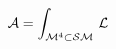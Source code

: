 \begin{equation}
{\cal A} = \int_{{\cal M}^{4} \subset {\cal SM}} \, {\cal L}
\label{campodicalcio}
\end{equation}

